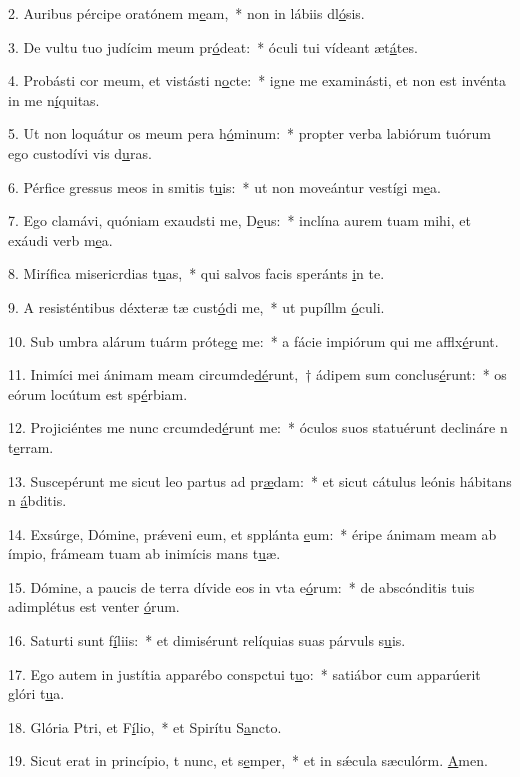 2. Auribus pércipe oratónem m\uline{e}am,~* non in lábiis dl\uline{ó}sis.\par 
3. De vultu tuo judícim meum pr\uline{ó}deat:~* óculi tui vídeant æt\uline{á}tes.\par 
4. Probásti cor meum, et vistásti n\uline{o}cte:~* igne me examinásti, et non est invénta in me n\uline{í}quitas.\par 
5. Ut non loquátur os meum pera h\uline{ó}minum:~* propter verba labiórum tuórum ego custodívi vis d\uline{u}ras.\par 
6. Pérfice gressus meos in smitis t\uline{u}is:~* ut non moveántur vestígi m\uline{e}a.\par 
7. Ego clamávi, quóniam exaudsti me, D\uline{e}us:~* inclína aurem tuam mihi, et exáudi verb m\uline{e}a.\par 
8. Mirífica misericrdias t\uline{u}as,~* qui salvos facis speránts \uline{i}n te.\par 
9. A resisténtibus déxteræ tæ cust\uline{ó}di me,~* ut pupíllm \uline{ó}culi.\par 
10. Sub umbra alárum tuárm próteg\uline{e} me:~* a fácie impiórum qui me afflx\uline{é}runt.\par 
11. Inimíci mei ánimam meam circumde\uline{dé}runt,~† ádipem sum conclus\uline{é}runt:~* os eórum locútum est sp\uline{é}rbiam.\par 
12. Projiciéntes me nunc crcumded\uline{é}runt me:~* óculos suos statuérunt declináre n t\uline{e}rram.\par 
13. Suscepérunt me sicut leo partus ad pr\uline{æ}dam:~* et sicut cátulus leónis hábitans n \uline{á}bditis.\par 
14. Exsúrge, Dómine, prǽveni eum, et spplánta \uline{e}um:~* éripe ánimam meam ab ímpio, frámeam tuam ab inimícis mans t\uline{u}æ.\par 
15. Dómine, a paucis de terra dívide eos in vta e\uline{ó}rum:~* de abscónditis tuis adimplétus est venter \uline{ó}rum.\par 
16. Saturti sunt f\uline{í}liis:~* et dimisérunt relíquias suas párvuls s\uline{u}is.\par 
17. Ego autem in justítia apparébo conspctui t\uline{u}o:~* satiábor cum apparúerit glóri t\uline{u}a.\par 
18. Glória Ptri, et F\uline{í}lio,~* et Spirítu S\uline{a}ncto.\par 
19. Sicut erat in princípio, t nunc, et s\uline{e}mper,~* et in sǽcula sæculórm. \uline{A}men.\par 
